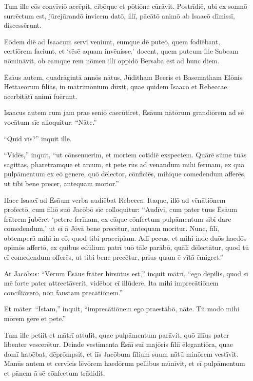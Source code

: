 \Versus Tum ille eōs convīviō accēpit, cibōque et pōtiōne cūrāvit.
\Versus Postrīdiē, ubi ex somnō surrēctum est, jūrejūrandō invicem datō, illī, pācātō animō ab Isaacō dīmissī, discessērunt.

\Versus Eōdem diē ad Isaacum servī veniunt, eumque dē puteō, quem fodiēbant, certiōrem faciunt, et `sēsē aquam invēnisse,' docent,
\Versus quem puteum ille Sabeam nōmināvit, ob eamque rem nōmen illī oppidō Bersaba est ad hunc diem.

\Versus Ēsāus autem, quadrāgintā annōs nātus, Jūditham Beeris et Basematham Elōnis Hettaeōrum fīliās, in mātrimōnium dūxit,
\Versus quae quidem Isaacō et Rebeccae acerbitātī animī fuērunt.



\Caput
\Versus Isaacus autem cum jam prae seniō caecūtīret, Ēsāum nātōrum grandiōrem ad sē vocātum sīc alloquitur: ``Nāte.''

``Quid vīs?'' inquit ille.

\Versus ``Vidēs,'' inquit, ``ut cōnsenuerim, et mortem cotīdiē exspectem.
\Versus Quārē sūme tuās sagittās, pharetramque et arcum, et pete rūs ad vēnandum mihi ferīnam,
\Versus ex quā pulpāmentum ex eō genere, quō dēlector, cōnficiēs, mihique comedendum afferēs, ut tibi bene precer, antequam morior.''

\Versus Haec Isaacī ad Ēsāum verba audiēbat Rebecca. Itaque, illō ad vēnātiōnem profectō,
\Versus cum fīliō suō Jacōbō sīc colloquitur: ``Audīvī, cum pater tuus Ēsāum frātrem jubēret `petere ferīnam,
\Versus ex eāque cōnfectum pulpāmentum sibi dare comedendum,' ut eī ā Jōvā bene precētur, antequam moritur.
\Versus Nunc, fīlī, obtemperā mihi in eō, quod tibi praecipiam.
\Versus Adī pecus, et mihi inde duōs haedōs opīmōs affertō, ex quibus edūlium patrī tuō tāle parābō, quālī dēlectātur,
\Versus quod tū eī comedendum offerēs, ut tibi bene precētur, prius quam ē vītā ēmigret.''

\Versus At Jacōbus: ``Vērum Ēsāus frāter hirsūtus est,'' inquit mātrī, ``ego dēpilis,
\Versus quod sī mē forte pater attrectāverit, vidēbor eī illūdere. Ita mihi imprecātiōnem conciliāverō, nōn faustam precātiōnem.''

\Versus Et māter: ``Istam,'' inquit, ``imprecātiōnem ego praestābō, nāte. Tū modo mihi mōrem gere et pete.''

\Versus Tum ille petiit et mātrī attulit, quae pulpāmentum parāvit, quō illīus pater libenter vescerētur.
\Versus Deinde vestīmenta Ēsāī suī majōris fīliī ēlegantiōra, quae domī habēbat, dēprōmpsit, et iīs Jacōbum fīlium suum nātū minōrem vestīvit.
\Versus Manūs autem et cervīcis lēvōrem haedōrum pellibus mūnīvit,
\Versus et eī pulpāmentum et pānem ā sē cōnfectum trādidit.

